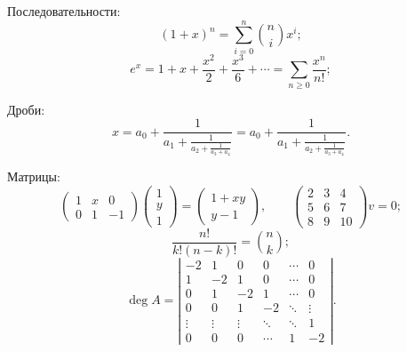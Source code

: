 Последовательности:
\begin{equation}
    (1+x)^n = \sum_{i=0}^n \binom{n}{i} x^i;
\end{equation}
\begin{equation}
    e^x = 1 + x + \frac{x^2}{2} + \frac{x^3}{6} + \cdots = \sum_{n \ge 0} \frac{x^n}{n!};
\end{equation}

Дроби:
\begin{equation}
    x = 
    a_0 + \frac{1}{a_1 + \frac{1}{a_2 + \frac{1}{a_3 + a_4}}}
    =
    a_0 + \frac{1}{\displaystyle a_1
        + \frac{1}{\displaystyle a_2
        + \frac{1}{\displaystyle a_3 + a_4}}}.
\end{equation}

Матрицы:
\begin{equation}
    \begin{pmatrix}
        1 & x & 0 \\
        0 & 1 & -1
    \end{pmatrix}
    \begin{pmatrix}
        1  \\
        y  \\
        1
    \end{pmatrix}
    =
    \begin{pmatrix}
        1 + xy  \\
        y - 1
    \end{pmatrix},
    \quad\quad
    \left(
    \begin{matrix}
        2 & 3 & 4\\
        5 & 6 & 7\\
        8 & 9 & 10
    \end{matrix}
    \right)
    v = 0;
\end{equation}
\begin{equation}
    \frac{n!}{k!(n-k)!} = \binom{n}{k};
\end{equation}
\begin{equation}
    \deg A =
    \left|
    \begin{matrix}
        -2 & 1 & 0 & 0 & \cdots & 0  \\
        1 & -2 & 1 & 0 & \cdots & 0  \\
        0 & 1 & -2 & 1 & \cdots & 0  \\
        0 & 0 & 1 & -2 & \ddots & \vdots \\
        \vdots & \vdots & \vdots & \ddots & \ddots & 1  \\
        0 & 0 & 0 & \cdots & 1 & -2
    \end{matrix}
    \right|.
\end{equation}

